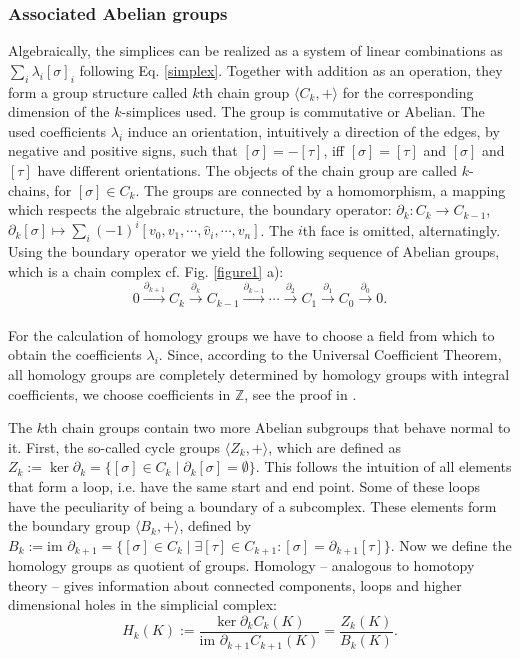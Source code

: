 \documentclass[runningheads,orivec]{llncs}
\begin{document}
\subsubsection{Associated Abelian groups} Algebraically, the simplices can be realized as a system of linear combinations as $\sum_i \lambda_i [\sigma]_{i}$ following Eq. \ref{simplex}. Together with addition as an operation, they form a group structure called $k$th chain group $\langle C_k, +\rangle$ for the corresponding dimension of the $k$-simplices used. The group is commutative or Abelian. The used coefficients $\lambda_i$ induce an orientation, intuitively a direction of the edges, by negative and positive signs, such that $[\sigma] = -[\tau]$, iff $[\sigma] = [\tau]$ and $[\sigma]$ and $[\tau]$ have different orientations. The objects of the chain group are called $k$-chains, for $[\sigma] \in C_k$. The groups are connected by a homomorphism, a mapping which respects the algebraic structure, the boundary operator: $\partial_k: C_k \rightarrow C_{k-1}$, $\partial_k [\sigma] \mapsto \sum_i (-1)^i [v_0,v_1,\cdots,\hat{v}_i, \cdots, v_n]$. The $i$th face is omitted, alternatingly. Using the boundary operator we yield the following sequence of Abelian groups, which is a chain complex cf. Fig. \ref{figure1} a):
\begin{equation}
    0 \xrightarrow[]{\partial_{k+1}} C_k \xrightarrow[]{\partial_{k}} C_{k-1} \xrightarrow[]{\partial_{k-1}} \cdots \xrightarrow[]{\partial_{2}} C_1 \xrightarrow[]{\partial_{1}} C_0 \xrightarrow[]{\partial_{0}} 0.
\end{equation}

For the calculation of homology groups we have to choose a field from which to obtain the coefficients $\lambda_i$. Since, according to the Universal Coefficient Theorem, all homology groups are completely determined by homology groups with integral coefficients, we choose coefficients in $\mathbb{Z}$, see the proof in \cite{gruenberg1968universal}.

The $k$th chain groups contain two more Abelian subgroups that behave normal to it. First, the so-called cycle groups $\langle Z_k, +\rangle$, which are defined as $Z_k := \ker \partial_k = \{[\sigma] \in C_k \; \vert \; \partial_k [\sigma] = \emptyset \}$. This follows the intuition of all elements that form a loop, i.e. have the same start and end point. Some of these loops have the peculiarity of being a boundary of a subcomplex. These elements form the boundary group $\langle B_k, +\rangle$, defined by $B_k := \text{im } \partial_{k+1} = \{[\sigma] \in C_k \; \vert \; \exists [\tau] \in C_{k+1}: [\sigma] = \partial_{k+1}[\tau]\}$. Now we define the homology groups as quotient of groups. Homology -- analogous to homotopy theory -- gives information about connected components, loops and higher dimensional holes in the simplicial complex:
\begin{equation}
    H_k(K) := \frac{\ker \partial_k C_k(K)}{\text{im } \partial_{k+1} C_{k+1}(K)} = \frac{Z_k(K)}{B_k(K)}.
\end{equation}
\end{document}
